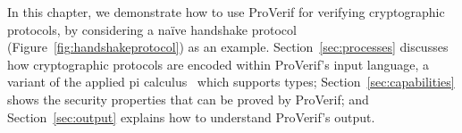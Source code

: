 \documentclass{book}
\begin{document}


In this chapter, we demonstrate how to use ProVerif for verifying cryptographic protocols, by considering a na\"{i}ve handshake protocol (Figure~\ref{fig:handshakeprotocol}) as an example. Section~\ref{sec:processes} discusses how cryptographic protocols are encoded within ProVerif's input language, a variant of the applied pi calculus~\cite{Abadi2001, Smyth2010} which supports types; Section~\ref{sec:capabilities} shows the security properties that can be proved by ProVerif; and Section~\ref{sec:output} explains how to understand ProVerif's output.
\end{document}
